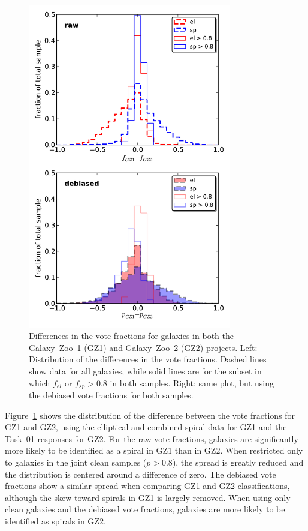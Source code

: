 \documentclass[useAMS,usenatbib]{mn2e}
\begin{document}
\begin{figure}
\includegraphics[angle=0,width=3.5in]{figures/gz1_gz2.pdf}
\caption{Differences in the vote fractions for galaxies in both the Galaxy~Zoo~1 (GZ1) and Galaxy~Zoo~2 (GZ2) projects. Left: Distribution of the differences in the vote fractions. Dashed lines show data for all galaxies, while solid lines are for the subset in which $f_{el}$ or $f_{sp} > 0.8$ in both samples. Right: same plot, but using the debiased vote fractions for both samples. 
\label{fig-gz1_gz2}}
\end{figure}

Figure~\ref{fig-gz1_gz2} shows the distribution of the difference between the vote fractions for GZ1 and GZ2, using the elliptical and combined spiral data for GZ1 and the Task~01 responses for GZ2. For the raw vote fractions, galaxies are significantly more likely to be identified as a spiral in GZ1 than in GZ2. When restricted only to galaxies in the joint clean samples ($p>0.8$), the spread is greatly reduced and the distribution is centered around a difference of zero. The debiased vote fractions show a similar spread when comparing GZ1 and GZ2 classifications, although the skew toward spirals in GZ1 is largely removed. When using only clean galaxies and the debiased vote fractions, galaxies are more likely to be identified as spirals in GZ2. 
\end{document}
